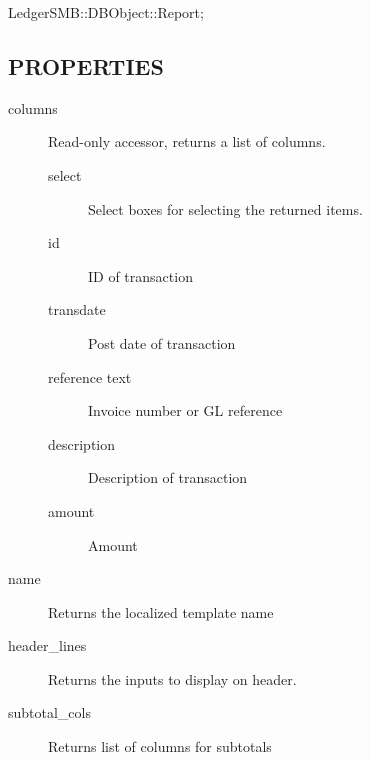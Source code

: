 \begin{description}
\begin{description}
\begin{description}
\begin{description}
\begin{description}
\begin{description}
\begin{description}
\begin{description}
\begin{description}
\begin{description}
\begin{description}
\item[{LedgerSMB::DBObject::Report;}] \mbox{}\end{description}
\subsection*{PROPERTIES\label{LedgerSMB::DBObject::Report::Unapproved::Drafts_PROPERTIES}}
\begin{description}

\item[{columns}] \mbox{}

Read-only accessor, returns a list of columns.

\begin{description}

\item[{select}] \mbox{}

Select boxes for selecting the returned items.


\item[{id}] \mbox{}

ID of transaction


\item[{transdate}] \mbox{}

Post date of transaction


\item[{reference text}] \mbox{}

Invoice number or GL reference


\item[{description}] \mbox{}

Description of transaction


\item[{amount}] \mbox{}

Amount

\end{description}

\item[{name}] \mbox{}

Returns the localized template name


\item[{header\_lines}] \mbox{}

Returns the inputs to display on header.


\item[{subtotal\_cols}] \mbox{}

Returns list of columns for subtotals

\end{description}

\end{description}
\end{description}
\end{description}
\end{description}
\end{description}
\end{description}
\end{description}
\end{description}
\end{description}
\end{description}
